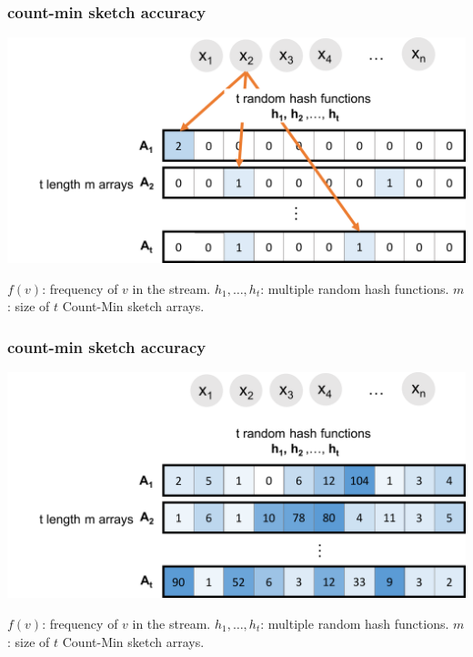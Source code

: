 \documentclass[]{beamer}
\begin{document}
	\begin{frame}
		\frametitle{count-min sketch accuracy}
		\begin{center}
			\hspace{-2em}
			\includegraphics[width=.85\textwidth]{cmm2.png}
		\end{center}
		
		\vspace{4em}
		\begin{block}{\vspace*{-3ex}}
			\small $f(v)$: frequency of $v$ in the stream. $h_1, \ldots, h_t$: multiple random hash functions. $m$: size of $t$ Count-Min sketch arrays.
		\end{block}
	\end{frame}
	
	\begin{frame}
		\frametitle{count-min sketch accuracy}
		\begin{center}
			\hspace{-2em}
			\includegraphics[width=.85\textwidth]{cmm4.png}
		\end{center}
		
		\vspace{4em}
		\begin{block}{\vspace*{-3ex}}
			\small $f(v)$: frequency of $v$ in the stream. $h_1, \ldots, h_t$: multiple random hash functions. $m$: size of $t$ Count-Min sketch arrays.
		\end{block}
	\end{frame}
	
\end{document}
